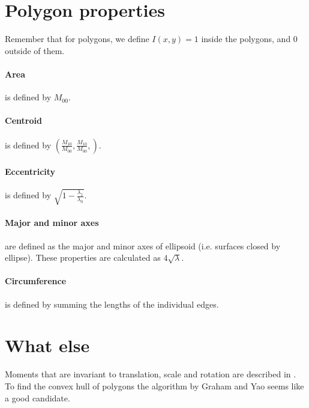 \documentclass{article}
\begin{document}
\section{Polygon properties}
Remember that for polygons, we define $I(x,y)=1$ inside the polygons, and $0$ outside of them.
\paragraph{Area} is defined by $M_{00}$.
\paragraph{Centroid} is defined by $\left(\frac{M_{10}}{M_{00}}, \frac{M_{10}}{M_{00}}, \right)$.
\paragraph{Eccentricity} is defined by $\sqrt{1-\frac{\lambda_1}{\lambda_0}}$.
\paragraph{Major and minor axes} are defined as the major and minor axes of ellipsoid (i.e. surfaces closed by ellipse). These properties are calculated as $4\sqrt{\lambda}$.
\paragraph{Circumference} is defined by summing the lengths of the individual edges.

\section{What else}
Moments that are invariant to translation, scale and rotation are described in \cite{hu1962visual}. To find the convex hull of polygons the algorithm by Graham and Yao \cite{graham1983finding} seems like a good candidate.

\end{document}
